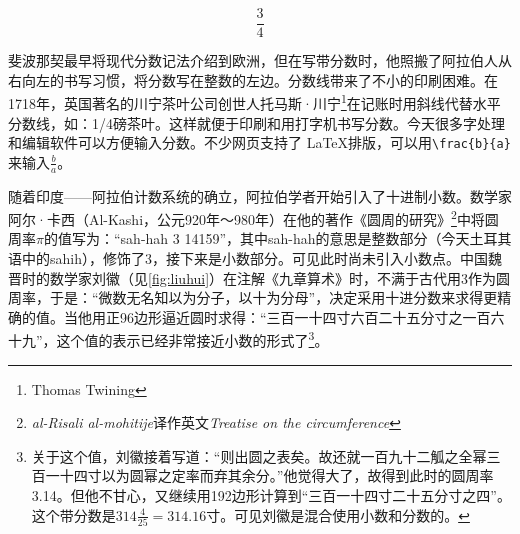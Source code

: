 \documentclass[b5paper]{ctexart}
\begin{document}
\[
\dfrac{3}{4}
\]

斐波那契最早将现代分数记法介绍到欧洲，但在写带分数时，他照搬了阿拉伯人从右向左的书写习惯，将分数写在整数的左边\cite{Miller-2025}。分数线带来了不小的印刷困难。在1718年，英国著名的川宁茶叶公司创世人托马斯·川宁\footnote{Thomas Twining}在记账时用斜线代替水平分数线，如：1/4磅茶叶。这样就便于印刷和用打字机书写分数。今天很多字处理和编辑软件可以方便输入分数。不少网页支持了 \LaTeX 排版，可以用\lstinline|\frac{b}{a}|来输入$\frac{b}{a}$。

 
随着印度——阿拉伯计数系统的确立，阿拉伯学者开始引入了十进制小数。数学家阿尔·卡西（Al-Kashi，公元920年～980年）在他的著作《圆周的研究》\footnote{{\em al-Risali al-mohitije}译作英文{\em Treatise on the circumference}}中将圆周率$\pi$的值写为：“sah-hah 3 14159”，其中sah-hah的意思是整数部分（今天土耳其语中的sahih），修饰了3，接下来是小数部分。可见此时尚未引入小数点。中国魏晋时的数学家刘徽（见\cref{fig:liuhui}）在注解《九章算术》时，不满于古代用3作为圆周率，于是：“微数无名知以为分子，以十为分母”，决定采用十进分数来求得更精确的值。当他用正96边形逼近圆时求得：“三百一十四寸六百二十五分寸之一百六十九”，这个值的表示已经非常接近小数的形式了\footnote{关于这个值，刘徽接着写道：“则出圆之表矣。故还就一百九十二觚之全幂三百一十四寸以为圆幂之定率而弃其余分。”他觉得大了，故得到此时的圆周率3.14。但他不甘心，又继续用192边形计算到“三百一十四寸二十五分寸之四”。这个带分数是$314\frac{4}{25} = 314.16$寸。可见刘徽是混合使用小数和分数的。}。
\end{document}
